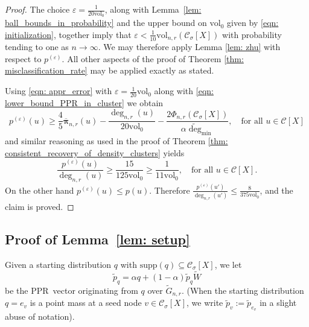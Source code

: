 \documentclass[11pt,twoside]{article}
\newcommand{\vol}{\mathrm{vol}}
\newcommand{\1}{\mathbf{1}}
\newcommand{\pbf}{p}        %
\newcommand{\pibf}{\bm{\pi}}
\newcommand{\Xbf}{X}             %
\newcommand{\Wbf}{W}
\newcommand{\Cset}{\mathcal{C}}
\newcommand{\Csig}{\Cset_{\sigma}}
\newcommand{\degminwt}{\widetilde{\deg}_{\min}}
\newcommand{\pprspace}{{\sc PPR~}}
\begin{document}
\begin{proof}
The choice $\varepsilon = \frac{1}{20 \vol_0}$, along with Lemma~\ref{lem: ball_bounds_in_probability} and the upper bound on $\vol_0$ given by \eqref{eqn: initialization}, together imply that $\varepsilon < \frac{1}{10}\vol_{n,r}(\Csig[\Xbf])$ with probability tending to one as $n \to \infty$. We may therefore apply Lemma \ref{lem: zhu} with respect to $\pbf^{(\varepsilon)}$. All other aspects of the proof of Theorem \ref{thm: misclassification_rate} may be applied exactly as stated.



Using \eqref{eqn: appr_error} with $\varepsilon = \frac{1}{20}\vol_0$ along with \eqref{eqn: lower_bound_PPR_in_cluster} we obtain
\begin{equation*}
\pbf^{(\varepsilon)}(u) \geq \frac{4}{5} \overline{\pibf}_{n,r}(u) - \frac{\deg_{n,r}(u)}{20\vol_0} - \frac{2\Phi_{n,r}(\Csig[\Xbf])}{\alpha \degminwt}, \quad \textrm{for all $u \in \Cset[\Xbf]$}
\end{equation*}
and similar reasoning as used in the proof of Theorem \ref{thm: consistent_recovery_of_density_clusters} yields
\begin{equation*}
\frac{\pbf^{(\varepsilon)}(u)}{\deg_{n,r}(u)} \geq \frac{15}{125\vol_0} \geq \frac{1}{11 \vol_0}, \quad \textrm{for all $u \in \Cset[\Xbf]$}.
\end{equation*}
On the other hand $\pbf^{(\varepsilon)}(u) \leq \pbf(u)$. Therefore $\frac{\pbf^{(\varepsilon)}(u')}{\deg_{n,r}(u')} \leq \frac{8}{375\vol_0}$, and the claim is proved.

\end{proof}

\subsection{Proof of Lemma~\ref{lem: setup}}
	Given a starting distribution $q$ with $\mathrm{supp}(q) \subseteq \Csig[\Xbf]$, we let
	\begin{equation}
	\widetilde{\pbf}_q = \alpha q + (1 - \alpha) \widetilde{\pbf}_{q} \widetilde{\Wbf}
	\end{equation}
	be the \pprspace vector originating from $q$ over $\widetilde{G}_{n,r}$. (When the starting distribution $q = e_v$ is a point mass at a seed node $v \in \Csig[\Xbf]$, we write $\widetilde{\pbf}_v := \widetilde{\pbf}_{e_v}$ in a slight abuse of notation).
	
\end{document}
